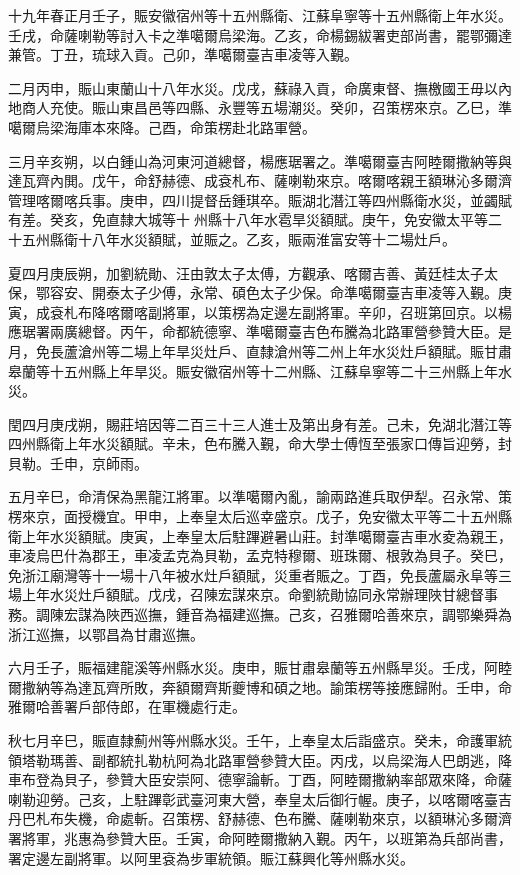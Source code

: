 \begin{pinyinscope}
十九年春正月壬子，賑安徽宿州等十五州縣衛、江蘇阜寧等十五州縣衛上年水災。壬戌，命薩喇勒等討入卡之準噶爾烏梁海。乙亥，命楊錫紱署吏部尚書，罷鄂彌達兼管。丁丑，琉球入貢。己卯，準噶爾臺吉車凌等入覲。

二月丙申，賑山東蘭山十八年水災。戊戌，蘇祿入貢，命廣東督、撫檄國王毋以內地商人充使。賑山東昌邑等四縣、永豐等五場潮災。癸卯，召策楞來京。乙巳，準噶爾烏梁海庫本來降。己酉，命策楞赴北路軍營。

三月辛亥朔，以白鍾山為河東河道總督，楊應琚署之。準噶爾臺吉阿睦爾撒納等與達瓦齊內閧。戊午，命舒赫德、成袞札布、薩喇勒來京。喀爾喀親王額琳沁多爾濟管理喀爾喀兵事。庚申，四川提督岳鍾琪卒。賑湖北潛江等四州縣衛水災，並蠲賦有差。癸亥，免直隸大城等十州縣十八年水雹旱災額賦。庚午，免安徽太平等二十五州縣衛十八年水災額賦，並賑之。乙亥，賑兩淮富安等十二場灶戶。

夏四月庚辰朔，加劉統勛、汪由敦太子太傅，方觀承、喀爾吉善、黃廷桂太子太保，鄂容安、開泰太子少傅，永常、碩色太子少保。命準噶爾臺吉車凌等入覲。庚寅，成袞札布降喀爾喀副將軍，以策楞為定邊左副將軍。辛卯，召班第回京。以楊應琚署兩廣總督。丙午，命都統德寧、準噶爾臺吉色布騰為北路軍營參贊大臣。是月，免長蘆滄州等二場上年旱災灶戶、直隸滄州等二州上年水災灶戶額賦。賑甘肅皋蘭等十五州縣上年旱災。賑安徽宿州等十二州縣、江蘇阜寧等二十三州縣上年水災。

閏四月庚戌朔，賜莊培因等二百三十三人進士及第出身有差。己未，免湖北潛江等四州縣衛上年水災額賦。辛未，色布騰入覲，命大學士傅恆至張家口傳旨迎勞，封貝勒。壬申，京師雨。

五月辛巳，命清保為黑龍江將軍。以準噶爾內亂，諭兩路進兵取伊犁。召永常、策楞來京，面授機宜。甲申，上奉皇太后巡幸盛京。戊子，免安徽太平等二十五州縣衛上年水災額賦。庚寅，上奉皇太后駐蹕避暑山莊。封準噶爾臺吉車水夌為親王，車凌烏巴什為郡王，車凌孟克為貝勒，孟克特穆爾、班珠爾、根敦為貝子。癸巳，免浙江廟灣等十一場十八年被水灶戶額賦，災重者賑之。丁酉，免長蘆屬永阜等三場上年水災灶戶額賦。戊戌，召陳宏謀來京。命劉統勛協同永常辦理陜甘總督事務。調陳宏謀為陜西巡撫，鍾音為福建巡撫。己亥，召雅爾哈善來京，調鄂樂舜為浙江巡撫，以鄂昌為甘肅巡撫。

六月壬子，賑福建龍溪等州縣水災。庚申，賑甘肅皋蘭等五州縣旱災。壬戌，阿睦爾撒納等為達瓦齊所敗，奔額爾齊斯夔博和碩之地。諭策楞等接應歸附。壬申，命雅爾哈善署戶部侍郎，在軍機處行走。

秋七月辛巳，賑直隸薊州等州縣水災。壬午，上奉皇太后詣盛京。癸未，命護軍統領塔勒瑪善、副都統扎勒杭阿為北路軍營參贊大臣。丙戌，以烏梁海人巴朗逃，降車布登為貝子，參贊大臣安崇阿、德寧論斬。丁酉，阿睦爾撒納率部眾來降，命薩喇勒迎勞。己亥，上駐蹕彰武臺河東大營，奉皇太后御行幄。庚子，以喀爾喀臺吉丹巴札布失機，命處斬。召策楞、舒赫德、色布騰、薩喇勒來京，以額琳沁多爾濟署將軍，兆惠為參贊大臣。壬寅，命阿睦爾撒納入覲。丙午，以班第為兵部尚書，署定邊左副將軍。以阿里袞為步軍統領。賑江蘇興化等州縣水災。


\end{pinyinscope}
